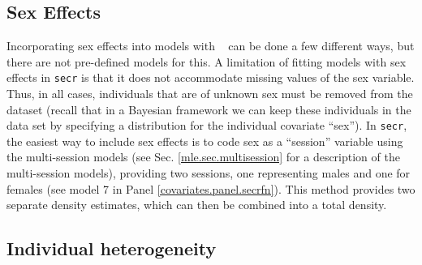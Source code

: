 \subsection{Sex Effects}
\label{covariates.secr.sex}

Incorporating sex effects into
models with \secr~ can be done a few different ways, but there are not
pre-defined models for this.  A limitation of fitting models with sex
effects in \mbox{\tt secr} is that it does not accommodate missing
values of the sex variable. Thus, in all cases,
individuals that are of unknown sex must be removed from the dataset
(recall that in a Bayesian framework we can keep these individuals in
the data set by specifying a distribution for the individual covariate
``sex'').
In \mbox{\tt secr}, the easiest way to include sex effects is 
to code sex as a  ``session'' variable using the multi-session models
(see Sec. \ref{mle.sec.multisession} for a description
of the multi-session models), providing two sessions, one representing
males and one for females (see model 7 in Panel
\ref{covariates.panel.secrfn}).  This method provides two separate
density estimates, which can then be combined into a total density.

\subsection{Individual heterogeneity}
\label{covariates.sec.secrH2}

